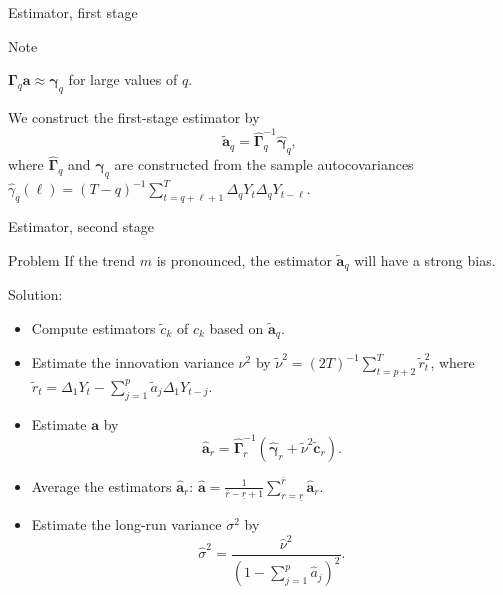 \documentclass[10pt, handout]{beamer}
\begin{document}
\begin{frame}{Estimator, first stage}

\begin{block}{Note}
\vspace{-3mm}
\begin{center}
$\boldsymbol{\Gamma}_q \boldsymbol{a} \approx \boldsymbol{\gamma}_q$ for large values of $q$.
\end{center}\vspace{-3mm}\end{block}\pause
\vspace{-3mm}

We construct the first-stage estimator by
\begin{equation*}
\widetilde{\boldsymbol{a}}_q = \widehat{\boldsymbol{\Gamma}}_q^{-1} \widehat{\boldsymbol{\gamma}}_q, 
\end{equation*}
where $\widehat{\boldsymbol{\Gamma}}_q$ and $\widehat{\boldsymbol{\gamma}}_q$ are constructed from the sample autocovariances $\widehat{\gamma}_q(\ell) = (T-q)^{-1} \sum_{t=q+\ell+1}^T \Delta_q Y_{t} \Delta_q Y_{t-\ell}$. 
\end{frame}



\begin{frame}{Estimator, second stage}
\begin{block}{Problem}
If the trend $m$ is pronounced, the estimator $\widetilde{\boldsymbol{a}}_q$ will have a strong bias.
\end{block}\pause
\vspace{-2mm}
Solution:
\begin{itemize}
	\item \vspace{-2mm} Compute estimators $\widetilde{c}_k$ of $c_k$ based on $\widetilde{\boldsymbol{a}}_q$.\pause
	\item Estimate the innovation variance $\nu^2$ by $\widetilde{\nu}^2 = (2T)^{-1} \sum_{t=p+2}^T \widetilde{r}_{t}^2$, where $\widetilde{r}_{t} = \Delta_1 Y_{t} - \sum_{j=1}^p \widetilde{a}_j \Delta_1 Y_{t-j}$.\pause
	\item Estimate $\boldsymbol{a}$ by 
\begin{equation*}\label{est-AR-SS} 
\widehat{\boldsymbol{a}}_r = \widehat{\boldsymbol{\Gamma}}_r^{-1} (\widehat{\boldsymbol{\gamma}}_r + \widetilde{\nu}^2 \widetilde{\boldsymbol{c}}_r).
\end{equation*}\pause
	\item \vspace{-2mm} Average the estimators $\widehat{\boldsymbol{a}}_r$: $\widehat{\boldsymbol{a}} = \frac{1}{\overline{r} - \underline{r} + 1} \sum\limits_{r=\underline{r}}^{\overline{r}} \widehat{\boldsymbol{a}}_r$.\pause
	\item Estimate the long-run variance $\sigma^2$ by 
\begin{equation*} \label{est-lrv}
\widehat{\sigma}^2 = \frac{\widehat{\nu}^2}{(1 - \sum_{j=1}^p \widehat{a}_j)^2}. 
\end{equation*}
\end{itemize}
\end{frame}
\end{document}
